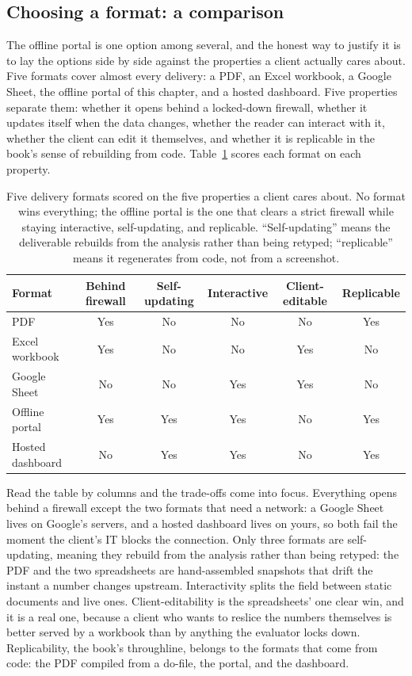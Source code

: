 \documentclass[
    a4paper,
    fontsize=10pt,
    twoside=true,
    numbers=noenddot,
]{kaobook}
\begin{document}
\subsection{Choosing a format: a comparison}
The offline portal is one option among several, and the honest way to justify it is to lay the options side by side against the properties a client actually cares about. Five formats cover almost every delivery: a PDF, an Excel workbook, a Google Sheet, the offline portal of this chapter, and a hosted dashboard. Five properties separate them: whether it opens behind a locked-down firewall, whether it updates itself when the data changes, whether the reader can interact with it, whether the client can edit it themselves, and whether it is replicable in the book's sense of rebuilding from code. Table~\ref{tab:formats} scores each format on each property.

\begin{table}[htbp]
\centering
\footnotesize
\caption[Delivery formats compared]{Five delivery formats scored on the five properties a client cares about. No format wins everything; the offline portal is the one that clears a strict firewall while staying interactive, self-updating, and replicable. \enquote{Self-updating} means the deliverable rebuilds from the analysis rather than being retyped; \enquote{replicable} means it regenerates from code, not from a screenshot.}
\label{tab:formats}
\begin{tabular}{lccccc}
\hline
Format & Behind firewall & Self-updating & Interactive & Client-editable & Replicable \\
\hline
PDF               & Yes & No  & No  & No  & Yes \\
Excel workbook    & Yes & No  & No  & Yes & No  \\
Google Sheet      & No  & No  & Yes & Yes & No  \\
Offline portal    & Yes & Yes & Yes & No  & Yes \\
Hosted dashboard  & No  & Yes & Yes & No  & Yes \\
\hline
\end{tabular}
\end{table}

Read the table by columns and the trade-offs come into focus. Everything opens behind a firewall except the two formats that need a network: a Google Sheet lives on Google's servers, and a hosted dashboard lives on yours, so both fail the moment the client's IT blocks the connection. Only three formats are self-updating, meaning they rebuild from the analysis rather than being retyped: the PDF and the two spreadsheets are hand-assembled snapshots that drift the instant a number changes upstream. Interactivity splits the field between static documents and live ones. Client-editability is the spreadsheets' one clear win, and it is a real one, because a client who wants to reslice the numbers themselves is better served by a workbook than by anything the evaluator locks down. Replicability, the book's throughline, belongs to the formats that come from code: the PDF compiled from a do-file, the portal, and the dashboard.
\end{document}
